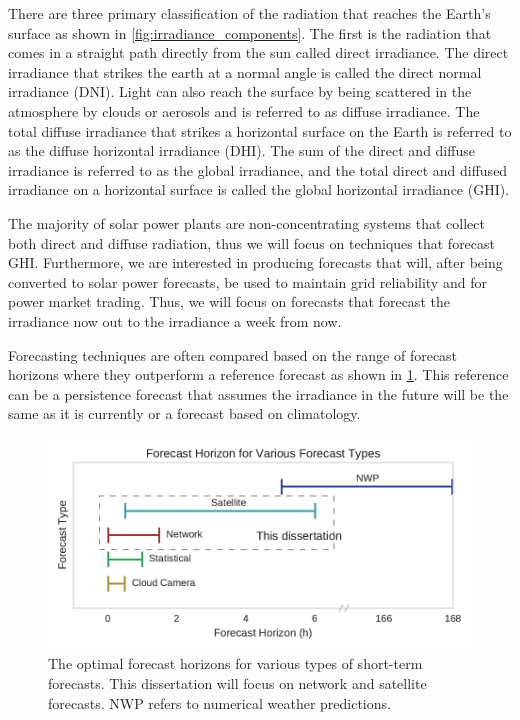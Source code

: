 There are three primary classification of the radiation that reaches
the Earth's surface as shown in \cref{fig:irradiance_components}.
The first is the radiation that comes in a straight path directly from
the sun called direct irradiance.
The direct irradiance that strikes the earth at a normal angle is
called the direct normal irradiance (DNI).
Light can also reach the surface by being scattered in the atmosphere
by clouds or aerosols and is referred to as diffuse irradiance.
The total diffuse irradiance that strikes a horizontal surface on the
Earth is referred to as the diffuse horizontal irradiance (DHI).
The sum of the direct and diffuse irradiance is referred to as the
global irradiance, and the total direct and diffused irradiance on a
horizontal surface is called the global horizontal irradiance (GHI).

The majority of solar power plants are non-concentrating systems that
collect both direct and diffuse radiation, thus we will focus on
techniques that forecast GHI.
Furthermore, we are interested in producing forecasts that will,
after being converted to solar power forecasts, be used to maintain
grid reliability and for power market trading.
Thus, we will focus on forecasts that forecast the irradiance now out
to the irradiance a week from now.

Forecasting techniques are often compared based on the range of
forecast horizons where they outperform a reference forecast as shown
in \cref{fig:fxhoriz}.
This reference can be a persistence forecast that assumes the
irradiance in the future will be the same as it is currently or a
forecast based on climatology.

\begin{figure}[tbh]
\includegraphics[width=\textwidth]{figs/fxhoriz.pdf}
\caption[Forecast horizon for various forecast types]{The optimal
  forecast horizons for various types of short-term forecasts. This
  dissertation will focus on network and satellite forecasts. NWP
  refers to numerical weather predictions.}
\label{fig:fxhoriz}
\end{figure}

